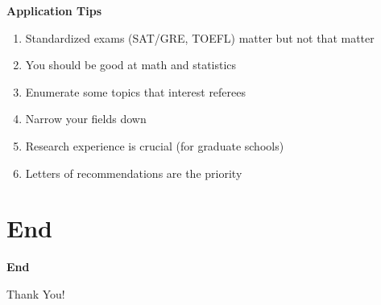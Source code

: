 \documentclass{beamer}
\let\olditem=\item%
\renewcommand{\item}{\olditem \justifying}%
\begin{document}
\begin{frame}{\bf Application Tips}
\begin{enumerate}
	\item Standardized exams (SAT/GRE, TOEFL) matter but not that matter
	\item You should be good at math and statistics
	\item Enumerate some topics that interest referees
	\item Narrow your fields down
	\item Research experience is crucial (for graduate schools)
	\item Letters of recommendations are the priority
\end{enumerate}
\end{frame}



\section{End}
\begin{frame}{\bf End}
\begin{center}
	\Large{Thank You!}
\end{center}
\end{frame}
\end{document}
